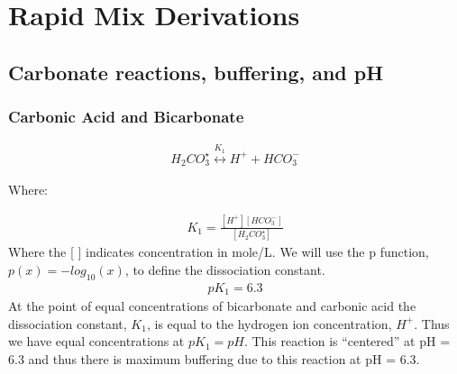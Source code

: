 \documentclass[letterpaper,10pt,english]{sphinxmanual}
\begin{document}
\chapter{Rapid Mix Derivations}
\label{\detokenize{Rapid_Mix/RM_Derivations:rapid-mix-derivations}}\label{\detokenize{Rapid_Mix/RM_Derivations:title-rapid-mix-derivations}}\label{\detokenize{Rapid_Mix/RM_Derivations::doc}}

\section{Carbonate reactions, buffering, and pH}
\label{\detokenize{Rapid_Mix/RM_Derivations:carbonate-reactions-buffering-and-ph}}\label{\detokenize{Rapid_Mix/RM_Derivations:heading-carbonate-reactions-buffering-and-ph}}

\subsection{Carbonic Acid and Bicarbonate}
\label{\detokenize{Rapid_Mix/RM_Derivations:carbonic-acid-and-bicarbonate}}\label{\detokenize{Rapid_Mix/RM_Derivations:heading-carbonic-acid-and-bicarbonate}}\begin{equation}\label{equation:Rapid_Mix/RM_Derivations:carbonate}
\begin{split}{H_2}CO_3^{\star} \overset {K_1} \longleftrightarrow {H^+} + HCO_3^-\end{split}
\end{equation}\begin{description}
\item[{Where:}] \leavevmode
{}

\end{description}
\begin{equation}\label{equation:Rapid_Mix/RM_Derivations:Rapid_Mix/RM_Derivations:0}
\begin{split}{K_1} = \frac{{\left[ {{H^ + }} \right]\left[ {HCO_3^ - } \right]}}{{\left[ {{H_2}CO_3^{\star} } \right]}}\end{split}
\end{equation}
Where the {[} {]} indicates concentration in mole/L. We will use the p function, \(p(x)=-log_{10}(x)\), to define the dissociation constant.
\begin{equation}\label{equation:Rapid_Mix/RM_Derivations:Rapid_Mix/RM_Derivations:1}
\begin{split}p{K_1} = 6.3\end{split}
\end{equation}
At the point of equal concentrations of bicarbonate and carbonic acid the dissociation constant, \(K_1\), is equal to the hydrogen ion concentration, \(H^ +\). Thus we have equal concentrations at \(p{K_1} = pH\). This reaction is “centered” at pH = 6.3 and thus there is maximum buffering due to this reaction at pH = 6.3.
\end{document}
